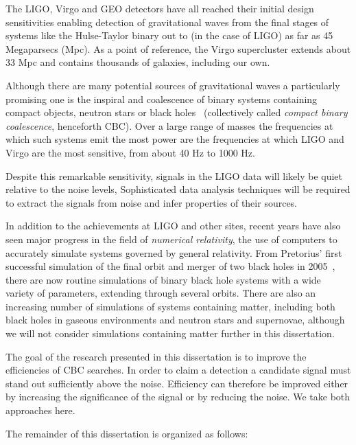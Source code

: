 The LIGO, Virgo and GEO detectors have all reached their initial
design sensitivities enabling detection of gravitational waves from
the final stages of systems like the Hulse-Taylor binary out to (in
the case of LIGO) as far as 45 Megaparsecs (Mpc).  As a point of
reference, the Virgo supercluster extends about 33 Mpc and contains
thousands of galaxies, including our own.

Although there are many potential sources of gravitational waves
a particularly promising one is the inspiral and coalescence of
binary systems containing compact objects, neutron stars or black
holes~\cite{thorne.k:1987} (collectively called \emph{compact binary
coalescence}, henceforth CBC).  Over a large range of masses the
frequencies at which such systems emit the most power are the
frequencies at which LIGO and Virgo are the most sensitive, from about
40 Hz to 1000 Hz.

Despite this remarkable sensitivity, signals in the LIGO data will
likely be quiet relative to the noise levels, Sophisticated data
analysis techniques will be required to extract the signals from noise
and infer properties of their sources.

In addition to the achievements at LIGO and other sites, recent years
have also seen major progress in the field of \emph{numerical
relativity}, the use of computers to accurately simulate systems
governed by general relativity.  From Pretorius' first successful
simulation of the final orbit and merger of two black holes in
2005~\cite{Pretorius:2005gq}, there are now routine simulations of
binary black hole systems with a wide variety of parameters, extending
through several orbits.  There are also an increasing number of
simulations of systems containing matter, including both black holes
in gaseous environments and neutron stars and supernovae, although we
will not consider simulations containing matter further in this
dissertation.


The goal of the research presented in this dissertation is to improve
the efficiencies of CBC searches.  In order to claim a detection a
candidate signal must stand out sufficiently above the noise.
Efficiency can therefore be improved either by increasing the
significance of the signal or by reducing the noise.  We take both
approaches here.

The remainder of this dissertation is organized as follows:

